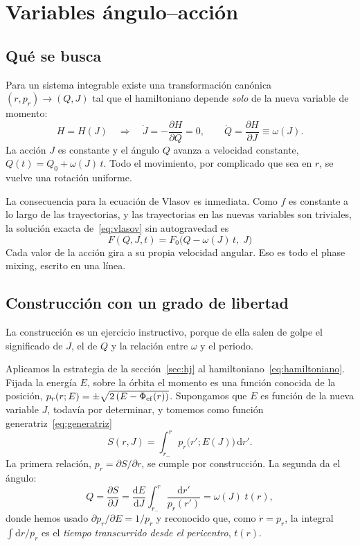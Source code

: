 \documentclass[11pt,a4paper]{article}
\newcommand{\dd}{\mathrm{d}}
\newcommand{\rp}{p_r}
\newcommand{\Jr}{J}
\newcommand{\Qr}{Q}
\theoremstyle{definition}
\begin{document}
\section{Variables ángulo--acción}
\label{sec:aa}

\subsection{Qué se busca}

Para un sistema integrable existe una transformación canónica $(r,\rp)\to(\Qr,\Jr)$
tal que el hamiltoniano depende \emph{solo} de la nueva variable de momento:
\begin{equation}
  H = H(\Jr) \quad\Longrightarrow\quad
  \dot{\Jr} = -\frac{\partial H}{\partial \Qr} = 0,
  \qquad
  \dot{\Qr} = \frac{\partial H}{\partial \Jr} \equiv \omega(\Jr).
  \label{eq:ecmov}
\end{equation}
La acción $\Jr$ es constante y el ángulo $\Qr$ avanza a velocidad constante,
$\Qr(t)=\Qr_0+\omega(\Jr)\,t$. Todo el movimiento, por complicado que sea en $r$,
se vuelve una rotación uniforme.

La consecuencia para la ecuación de Vlasov es inmediata. Como $f$ es constante a lo
largo de las trayectorias, y las trayectorias en las nuevas variables son triviales,
la solución exacta de~\eqref{eq:vlasov} sin autogravedad es
\begin{equation}
  \boxed{\;F(\Qr,\Jr,t) = F_0\big(\Qr - \omega(\Jr)\,t,\;\Jr\big)\;}
  \label{eq:solucion}
\end{equation}
Cada valor de la acción gira a su propia velocidad angular. Eso es todo el phase
mixing, escrito en una línea.

\subsection{Construcción con un grado de libertad}
\label{sec:construccion}

La construcción es un ejercicio instructivo, porque de ella salen de golpe el
significado de $\Jr$, el de $\Qr$ y la relación entre $\omega$ y el periodo.

Aplicamos la estrategia de la sección~\ref{sec:hj} al
hamiltoniano~\eqref{eq:hamiltoniano}. Fijada la energía $E$, sobre la órbita el momento
es una función conocida de la posición, $\rp(r;E)=\pm\sqrt{2\,(E-\Phi_{\rm ef}(r))}$. Supongamos que $E$ es
función de la nueva variable $\Jr$, todavía por determinar, y tomemos como función
generatriz~\eqref{eq:generatriz}
\begin{equation}
  S(r,\Jr) = \int_{r_-}^{r} \rp\big(r';E(\Jr)\big)\,\dd r' .
\end{equation}
La primera relación, $\rp=\partial S/\partial r$, se cumple por construcción. La
segunda da el ángulo:
\begin{equation}
  \Qr = \frac{\partial S}{\partial \Jr}
      = \frac{\dd E}{\dd \Jr}\int_{r_-}^{r}\frac{\dd r'}{\rp(r')}
      = \omega(\Jr)\;t(r),
  \label{eq:angulo}
\end{equation}
donde hemos usado $\partial\rp/\partial E = 1/\rp$ y reconocido que, como
$\dot r=\rp$, la integral $\int \dd r/\rp$ es el \emph{tiempo transcurrido desde el
pericentro}, $t(r)$.
\end{document}

